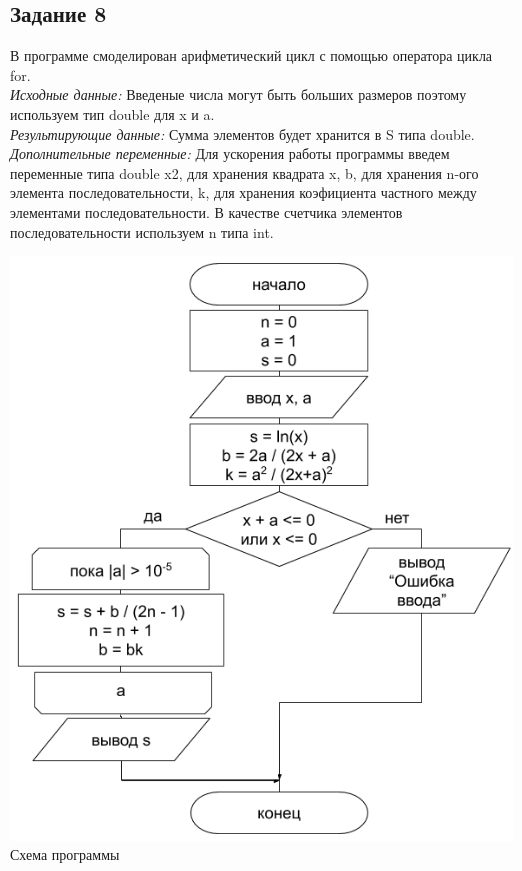 \documentclass[a4paper,14pt]{extarticle}
\begin{document}
\subsection{Задание 8}
В программе смоделирован арифметический цикл с помощью оператора цикла for.\\
\textit{Исходные данные:} Введеные числа могут быть больших размеров поэтому используем тип double для x и a.\\
\textit{Результирующие данные:} Сумма элементов будет хранится в S типа double.\\
\textit{Дополнительные переменные:} Для ускорения работы программы введем переменные типа double x2, для хранения квадрата x, b, для хранения n-ого элемента последовательности, k, для хранения коэфициента частного между элементами последовательности. В качестве счетчика элементов последовательности используем n типа int.\\
\begin{center}
\includegraphics[scale=0.6]{lab2-8.png}\\
Схема программы
\end{center}

\end{document}

